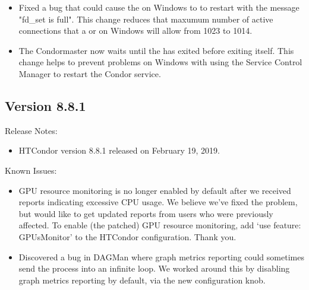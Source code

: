\begin{itemize}
\item Fixed a bug that could cause the  on Windows to to restart with the message
"fd\_set is full".  This change reduces that maxumum number of active connections that
a  or  on Windows will allow from 1023 to 1014.

\item The Condor{master} now waits until the  has exited before exiting itself. This change
helps to prevent problems on Windows with using the Service Control Manager to restart the Condor service.


\end{itemize}

\subsection*{\label{sec:New-8-8-1}Version 8.8.1}

\noindent Release Notes:

\begin{itemize}

\item HTCondor version 8.8.1 released on February 19, 2019.

\end{itemize}

\noindent Known Issues:

\begin{itemize}

\item GPU resource monitoring is no longer enabled by default after we
received reports indicating excessive CPU usage.  We believe we've fixed
the problem, but would like to get updated reports from users who were
previously affected.  To enable (the patched) GPU resource monitoring,
add `use feature: GPUsMonitor' to the HTCondor configuration.  Thank you.


\item Discovered a bug in DAGMan where graph metrics reporting could sometimes 
send the  process into an infinite loop. We worked around this 
by disabling graph metrics reporting by default, via the new  
 configuration knob.

\end{itemize}


